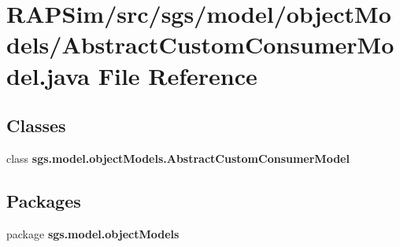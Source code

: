 \section{R\-A\-P\-Sim/src/sgs/model/object\-Models/\-Abstract\-Custom\-Consumer\-Model.java File Reference}
\label{_abstract_custom_consumer_model_8java}
\subsection*{Classes}
\begin{DoxyCompactItemize}
\item 
class {\bf sgs.\-model.\-object\-Models.\-Abstract\-Custom\-Consumer\-Model}
\end{DoxyCompactItemize}
\subsection*{Packages}
\begin{DoxyCompactItemize}
\item 
package {\bf sgs.\-model.\-object\-Models}
\end{DoxyCompactItemize}
